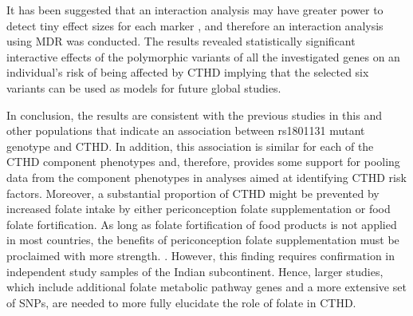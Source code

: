 \begin{refsection}
It has been suggested that an interaction analysis may have greater power to detect tiny effect sizes for each marker \cite{lupo2010gene}, and therefore an interaction analysis using MDR was conducted. The results revealed statistically significant interactive effects of the polymorphic variants of all the investigated genes on an individual’s risk of being affected by CTHD implying that the selected six variants can be used as models for future global studies.

In conclusion, the results are consistent with the previous studies in this and other populations that indicate an association between rs1801131 mutant genotype and CTHD. In addition, this association is similar for each of the CTHD component phenotypes and, therefore, provides some support for pooling data from the component phenotypes in analyses aimed at identifying CTHD risk factors. Moreover, a substantial proportion of CTHD might be prevented by increased folate intake by either periconception folate supplementation or food folate fortification. As long as folate fortification of food products is not applied in most countries, the benefits of periconception folate supplementation must be proclaimed with more strength. . However, this finding requires confirmation in independent study samples of the Indian subcontinent. Hence, larger studies, which include additional folate metabolic pathway genes and a more extensive set of SNPs, are needed to more fully elucidate the role of folate in CTHD.


\clearpage

\printbibliography[heading=subbibintoc]
\end{refsection}

